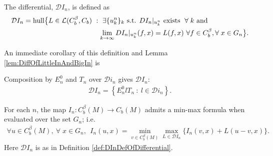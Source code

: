 \documentclass[11pt,reqno]{amsart}
\numberwithin{equation}{section}
\theoremstyle{plain}
\def\D{\mathcal D}
\def\hull{\textnormal{hull}}
\begin{document}
\begin{DEF}\label{def:DInDefOfDifferential}
	The differential, $\D I_n$, is defined as
    \begin{align*}
      \mathcal{D}I_n= \hull \big\{ L \in \mathcal{L}(C^{\beta}_b,C_b)\  &:\  \exists \{u^n_k\}_k \textnormal{ s.t. } DI_n|_{u^n_k} \textnormal{ exists }\;\forall\;k \textnormal{ and }\\ 
  	&\ \ \lim\limits_{k\to \infty} DI_n|_{u^n_k}(f,x) = L(f,x)\ \forall f\in C^\beta_b, \forall\; x\in G_n \big\}. 	  
    \end{align*}
\end{DEF}

An immediate corollary of this definition and Lemma \ref{lem:DiffOfLittleInAndBigIn} is
\begin{cor}\label{cor:RelateDifferentialSetOfLittleAndBigIn}
	Composition by $E_n^0$ and $T_n$ over $\D i_n$ gives $\D I_n$:
	\begin{align*}
		\D I_n = \left\{ E_n^0 l T_n\ :\ l \in\D i_n     \right\}.
	\end{align*}
\end{cor}

\begin{lem}\label{lem:InMinMax}
  For each $n$, the map $I_n: C^{\beta}_b(M) \to C_b(M)$ admits a min-max formula when evaluated over the set $G_n$; i.e. 
  \begin{align}\label{eqMMonM:InMinMax}
    \forall u\in C^\beta_b(M),\ \forall\; x\in G_n,\ \ I_n(u,x) = \min\limits_{v \in C^\beta_b(M)}\max\limits_{L \in \mathcal{D}I_n} \{ I_n(v,x)+L(u-v,x) \}.	  
  \end{align}	  
  Here $\D I_n$ is as in Definition \ref{def:DInDefOfDifferential}.
\end{lem}
\end{document}
